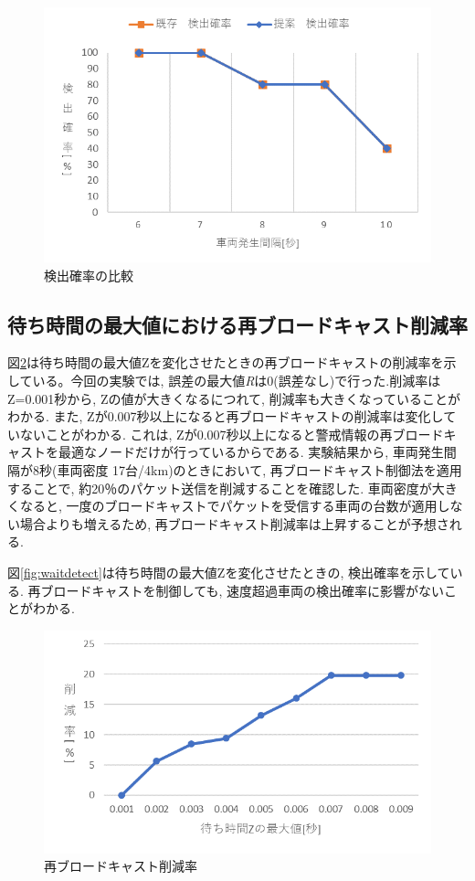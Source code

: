 \documentclass[10pt]{jreport}
\begin{document}
\begin{figure}[H]
\centering
\includegraphics[width=14cm]{figures/4_3detect.png}
\caption{検出確率の比較}
\label{fig:Pd}
\end{figure}

\subsection{待ち時間の最大値における再ブロードキャスト削減率}
図\ref{fig:remove}は待ち時間の最大値Zを変化させたときの再ブロードキャストの削減率を示している。今回の実験では, 誤差の最大値{\it R}は0(誤差なし)で行った.削減率はZ=0.001秒から, Zの値が大きくなるにつれて, 削減率も大きくなっていることがわかる. また, Zが0.007秒以上になると再ブロードキャストの削減率は変化していないことがわかる. これは, Zが0.007秒以上になると警戒情報の再ブロードキャストを最適なノードだけが行っているからである. 実験結果から, 車両発生間隔が8秒(車両密度 17台/4km)のときにおいて, 再ブロードキャスト制御法を適用することで, 約20％のパケット送信を削減することを確認した. 車両密度が大きくなると, 一度のブロードキャストでパケットを受信する車両の台数が適用しない場合よりも増えるため, 再ブロードキャスト削減率は上昇することが予想される.

図\ref{fig:waitdetect}は待ち時間の最大値Zを変化させたときの, 検出確率を示している. 再ブロードキャストを制御しても, 速度超過車両の検出確率に影響がないことがわかる.

\begin{figure}[H]
\centering
\includegraphics[width=14cm]{figures/4_3waittime.png}
\caption{再ブロードキャスト削減率}
\label{fig:remove}
\end{figure}
\end{document}
